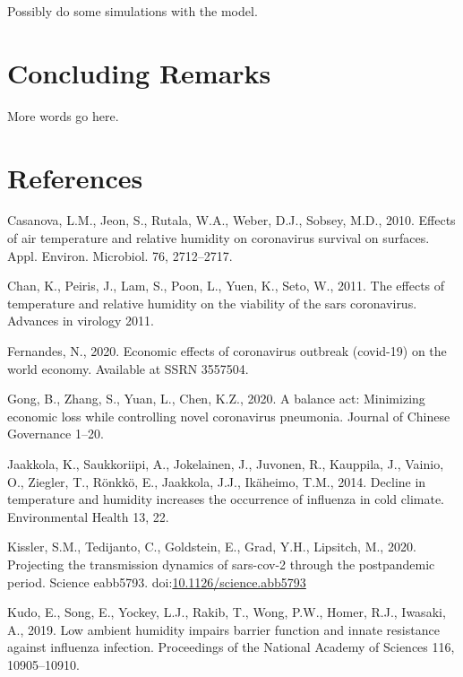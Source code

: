 \documentclass[]{elsarticle} %
\begin{document}
Possibly do some simulations with the model.

\hypertarget{concluding-remarks}{%
\section{Concluding Remarks}\label{concluding-remarks}}

More words go here.

\hypertarget{references}{%
\section*{References}\label{references}}

\hypertarget{refs}{}
\leavevmode\hypertarget{ref-Casanova2010effects}{}%
Casanova, L.M., Jeon, S., Rutala, W.A., Weber, D.J., Sobsey, M.D., 2010.
Effects of air temperature and relative humidity on coronavirus survival
on surfaces. Appl. Environ. Microbiol. 76, 2712--2717.

\leavevmode\hypertarget{ref-Chan2011effects}{}%
Chan, K., Peiris, J., Lam, S., Poon, L., Yuen, K., Seto, W., 2011. The
effects of temperature and relative humidity on the viability of the
sars coronavirus. Advances in virology 2011.

\leavevmode\hypertarget{ref-Fernandes2020economic}{}%
Fernandes, N., 2020. Economic effects of coronavirus outbreak (covid-19)
on the world economy. Available at SSRN 3557504.

\leavevmode\hypertarget{ref-Gong2020balance}{}%
Gong, B., Zhang, S., Yuan, L., Chen, K.Z., 2020. A balance act:
Minimizing economic loss while controlling novel coronavirus pneumonia.
Journal of Chinese Governance 1--20.

\leavevmode\hypertarget{ref-Jaakkola2014decline}{}%
Jaakkola, K., Saukkoriipi, A., Jokelainen, J., Juvonen, R., Kauppila,
J., Vainio, O., Ziegler, T., Rönkkö, E., Jaakkola, J.J., Ikäheimo, T.M.,
2014. Decline in temperature and humidity increases the occurrence of
influenza in cold climate. Environmental Health 13, 22.

\leavevmode\hypertarget{ref-Kissler2020projecting}{}%
Kissler, S.M., Tedijanto, C., Goldstein, E., Grad, Y.H., Lipsitch, M.,
2020. Projecting the transmission dynamics of sars-cov-2 through the
postpandemic period. Science eabb5793.
doi:\href{https://doi.org/10.1126/science.abb5793}{10.1126/science.abb5793}

\leavevmode\hypertarget{ref-Kudo2019low}{}%
Kudo, E., Song, E., Yockey, L.J., Rakib, T., Wong, P.W., Homer, R.J.,
Iwasaki, A., 2019. Low ambient humidity impairs barrier function and
innate resistance against influenza infection. Proceedings of the
National Academy of Sciences 116, 10905--10910.
\end{document}

